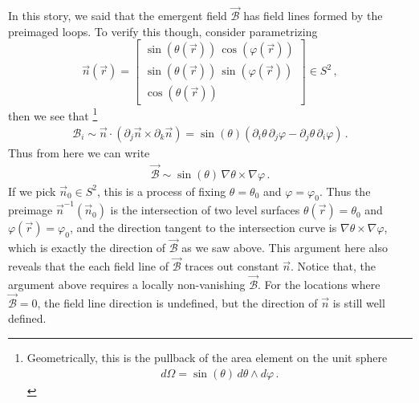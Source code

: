 \documentclass[11pt, onesided]{book}
\theoremstyle{break}
\theoremstyle{break}
\newcommand{\pd}{\partial}
\newcommand{\bmat}[1]{\begin{bmatrix} #1 \end{bmatrix}}
\begin{document}
In this story, we said that the emergent field $\vec{\mathcal{B}}$ has field lines formed by the preimaged loops. To verify this though, consider parametrizing 
$$\vec{n}(\vec{r}) = \bmat{\sin(\theta(\vec{r}))\, \cos(\varphi(\vec{r}))\\ \sin(\theta(\vec{r}))\,\sin(\varphi(\vec{r}))\\ \cos(\theta(\vec{r})) 
} \in S^2\,,$$
then we see that \footnote{Geometrically, this is the pullback of the area element on the unit sphere
\begin{align*}
d\Omega = \sin(\theta)\,d\theta \wedge d\varphi\,.
\end{align*}}
\begin{align*}
\mathcal{B}_i\sim \vec{n}\cdot(\pd_j \vec{n}\times \pd_k\vec{n}) = \sin(\theta) \left(\pd_i\theta\,\pd_j\varphi - \pd_j\theta\,\pd_i\varphi\right)\,.
\end{align*}
Thus from here we can write
\begin{align*}
\vec{\mathcal{B}}\sim \sin(\theta)\,\nabla\theta \times \nabla \varphi\,.
\end{align*}
If we pick $\vec{n}_0\in S^2$, this is a process of fixing $\theta = \theta_0$ and $\varphi = \varphi_0$. Thus the preimage $\vec{n}^{-1}(\vec{n}_0)$ is the intersection of two level surfaces $\theta(\vec{r}) = \theta_0$ and $\varphi(\vec{r}) = \varphi_0$, and the direction tangent to the intersection curve is $\nabla \theta \times \nabla \varphi$, which is exactly the direction of $\vec{\mathcal{B}}$ as we saw above. This argument here also reveals that the each field line of $\vec{\mathcal{B}}$ traces out constant $\vec{n}$.  Notice that, the argument above requires a locally non-vanishing $\vec{\mathcal{B}}$. For the locations where $\vec{\mathcal{B}}= 0$, the field line direction is undefined, but the direction of $\vec{n}$ is still well defined. 

\end{document}

